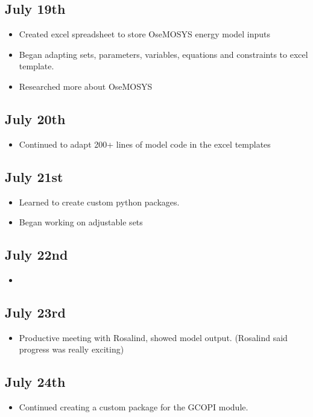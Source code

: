 \documentclass[12pt]{article}
\begin{document}
\subsection{July 19th}
\begin{itemize}
	\item Created excel spreadsheet to store OseMOSYS energy model inputs
	\item Began adapting sets, parameters, variables, equations and constraints to excel template.
	\item Researched more about OseMOSYS
\end{itemize}
\subsection{July 20th}
\begin{itemize}
	\item Continued to adapt 200+ lines of model code in the excel templates
\end{itemize}
\subsection{July 21st}
\begin{itemize}
	\item Learned to create custom python packages.
	\item Began working on adjustable sets
\end{itemize}
\subsection{July 22nd}
\begin{itemize}
	\item 
\end{itemize}
\subsection{July 23rd}
\begin{itemize}
	\item Productive meeting with Rosalind, showed model output. (Rosalind said progress was really exciting)
\end{itemize}
\subsection{July 24th}
\begin{itemize}
	\item Continued creating a custom package for the GCOPI module.
\end{itemize}
\end{document}
